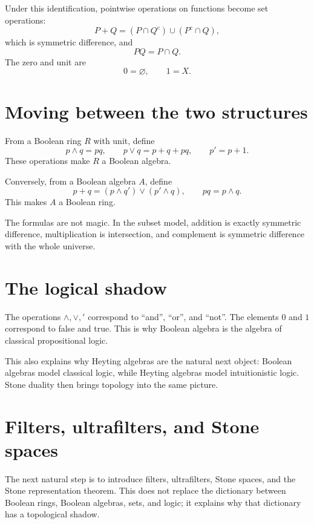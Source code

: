 Under this identification, pointwise operations on functions become set operations:
\[
  P+Q=(P\cap Q^c)\cup(P^c\cap Q),
\]
which is symmetric difference, and
\[
  PQ=P\cap Q.
\]
The zero and unit are
\[
  0=\varnothing,\qquad 1=X.
\]

\section{Moving between the two structures}

From a Boolean ring \(R\) with unit, define
\[
  p\wedge q=pq,\qquad
  p\vee q=p+q+pq,\qquad
  p'=p+1.
\]
These operations make \(R\) a Boolean algebra.

Conversely, from a Boolean algebra \(A\), define
\[
  p+q=(p\wedge q')\vee(p'\wedge q),\qquad pq=p\wedge q.
\]
This makes \(A\) a Boolean ring.

\begin{remark}
The formulas are not magic.  In the subset model, addition is exactly symmetric difference, multiplication is intersection, and complement is symmetric difference with the whole universe.
\end{remark}

\section{The logical shadow}

The operations \(\wedge,\vee,{}'\) correspond to ``and'', ``or'', and ``not''.  The elements \(0\) and \(1\) correspond to false and true.  This is why Boolean algebra is the algebra of classical propositional logic.

\begin{remark}
This also explains why Heyting algebras are the natural next object: Boolean algebras model classical logic, while Heyting algebras model intuitionistic logic.  Stone duality then brings topology into the same picture.
\end{remark}

\section{Filters, ultrafilters, and Stone spaces}

The next natural step is to introduce filters, ultrafilters, Stone spaces, and the Stone representation theorem.  This does not replace the dictionary between Boolean rings, Boolean algebras, sets, and logic; it explains why that dictionary has a topological shadow.

